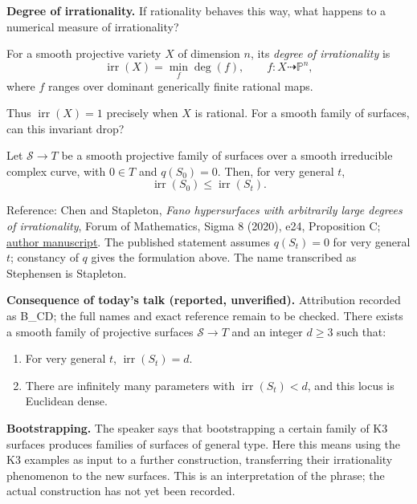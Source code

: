 \medskip\noindent
{\bf Degree of irrationality.}
If rationality behaves this way, what
happens to a numerical measure of
irrationality?

\begin{definition}
\label{definition-chen-irrationality}
For a smooth projective variety $X$
of dimension $n$, its
{\it degree of irrationality} is
$$
\operatorname{irr}(X)=\min_f\deg(f),
\qquad f:X\dashrightarrow\mathbb{P}^n,
$$
where $f$ ranges over dominant
generically finite rational maps.
\end{definition}

\noindent
Thus $\operatorname{irr}(X)=1$ precisely
when $X$ is rational.
For a smooth family of surfaces,
can this invariant drop?

\begin{theorem}
\label{theorem-chen-stapleton-specialization}
Let $\mathcal{S}\to T$ be a smooth
projective family of surfaces over a
smooth irreducible complex curve,
with $0\in T$ and $q(S_0)=0$.
Then, for very general $t$,
$$
\operatorname{irr}(S_0)
\leq\operatorname{irr}(S_t).
$$
\end{theorem}

\noindent
Reference: Chen and Stapleton,
{\it Fano hypersurfaces with arbitrarily
large degrees of irrationality},
Forum of Mathematics, Sigma 8 (2020),
e24, Proposition C;
\href{https://arxiv.org/abs/1908.02803}
{author manuscript}.
The published statement assumes
$q(S_t)=0$ for very general $t$;
constancy of $q$ gives the formulation
above. The name transcribed as
Stephensen is Stapleton.

\medskip\noindent
{\bf Consequence of today's talk
(reported, unverified).}
Attribution recorded as B\_CD;
the full names and exact reference
remain to be checked.
There exists a smooth family of
projective surfaces $\mathcal{S}\to T$
and an integer $d\geq3$ such that:
\begin{enumerate}
\item For very general $t$,
$\operatorname{irr}(S_t)=d$.
\item There are infinitely many parameters
with $\operatorname{irr}(S_t)<d$,
and this locus is Euclidean dense.
\end{enumerate}

\medskip\noindent
{\bf Bootstrapping.}
The speaker says that bootstrapping a
certain family of K3 surfaces produces
families of surfaces of general type.
Here this means using the K3 examples
as input to a further construction,
transferring their irrationality
phenomenon to the new surfaces.
This is an interpretation of the phrase;
the actual construction has not yet
been recorded.


